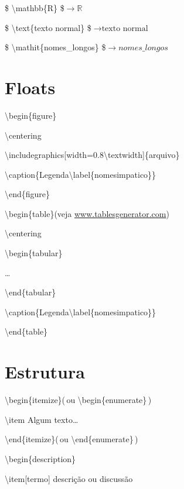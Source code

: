 \documentclass[11pt,twoside,english,brazil]{article}
\begin{document}
\begin{multicols}{3}
\$ \textbackslash{}mathbb\{R\} \$\enspace $\rightarrow \mathbb{R}$

\$ \textbackslash{}text\{texto normal\} \$\enspace $\rightarrow \text{texto normal}$

\$ \textbackslash{}mathit\{nomes\_longos\} \$\enspace $\rightarrow \mathit{nomes\_longos}$


\section*{Floats}

\textbackslash{}begin\{figure\}

\quad\textbackslash{}centering

\quad\textbackslash{}includegraphics[width=0.8\textbackslash{}textwidth]\{arquivo\}

\quad\textbackslash{}caption\{Legenda\textbackslash{}label\{nomesimpatico\}\}

\textbackslash{}end\{figure\}


\vspace{\baselineskip}


\textbackslash{}begin\{table\}\quad (veja \url{www.tablesgenerator.com})

\quad\textbackslash{}centering

\quad\textbackslash{}begin\{tabular\}

\quad\quad\dots

\quad\textbackslash{}end\{tabular\}

\quad\textbackslash{}caption\{Legenda\textbackslash{}label\{nomesimpatico\}\}

\textbackslash{}end\{table\}

\columnbreak


\section*{Estrutura}

\textbackslash{}begin\{itemize\}\quad (\,ou \textbackslash{}begin\{enumerate\}\,)

\quad\textbackslash{}item Algum texto\dots

\textbackslash{}end\{itemize\}\quad (\,ou \textbackslash{}end\{enumerate\}\,)


\vspace{\baselineskip}


\textbackslash{}begin\{description\}

\quad\textbackslash{}item[termo] descrição ou discussão


\end{multicols}
\end{document}
